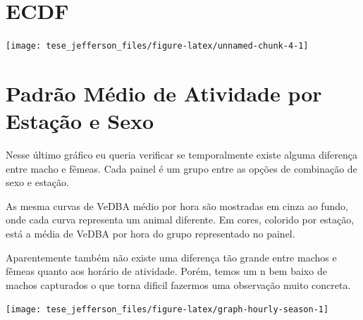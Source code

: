 \documentclass[english,msc,numbers,hidelinks]{coppe}
\begin{document}
  \hypertarget{ecdf}{%
  \section{ECDF}\label{ecdf}}
  \begin{center}\texttt{[image: tese\_jefferson\_files/figure-latex/unnamed-chunk-4-1]} \end{center}

  \newpage

  \hypertarget{padruxe3o-muxe9dio-de-atividade-por-estauxe7uxe3o-e-sexo}{%
  \section{Padrão Médio de Atividade por Estação e Sexo}\label{padruxe3o-muxe9dio-de-atividade-por-estauxe7uxe3o-e-sexo}}

  Nesse último gráfico eu queria verificar se temporalmente existe alguma diferença entre macho e fêmeas. Cada painel é um grupo entre as opções de combinação de sexo e estação.

  As mesma curvas de VeDBA médio por hora são mostradas em cinza ao fundo, onde cada curva representa um animal diferente. Em cores, colorido por estação, está a média de VeDBA por hora do grupo representado no painel.

  Aparentemente também não existe uma diferença tão grande entre machos e fêmeas quanto aos horário de atividade. Porém, temos um n bem baixo de machos capturados o que torna dificil fazermos uma observação muito concreta.
  \begin{center}\texttt{[image: tese\_jefferson\_files/figure-latex/graph-hourly-season-1]} \end{center}
\end{document}
